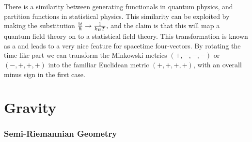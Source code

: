 \documentclass[10pt]{article}
\begin{document}
\begin{definition}
	There is a similarity between generating functionals in quantum physics, and partition functions in statistical physics. This similarity can be exploited by making the substitution
	$
	\frac{\mathrm{i}\mkern1mu t}{\hbar} \to \frac{1}{k_BT},
	$
	and the claim is that this will map a quantum field theory on to a statistical field theory. This transformation is known as a  and leads to a very nice feature for spacetime four-vectors. By rotating the time-like part we can transform the Minkowski metrics $(+,-,-,-)$ or $(-,+,+,+)$ into the familiar Euclidean metric $(+,+,+,+)$, with an overall minus sign in the first case.
\end{definition}






\newpage
\part{Gravity}






\section{Semi-Riemannian Geometry}\label{b3c1}
\end{document}
